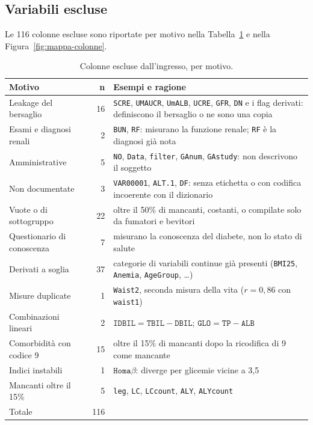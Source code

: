 \documentclass[a4paper, 12pt, oneside]{book}
\begin{document}
\subsection{Variabili escluse}

Le 116 colonne escluse sono riportate per motivo nella Tabella~\ref{tab:esclusioni} e nella Figura~\ref{fig:mappa-colonne}.

\begin{table}[H]
	\centering
	\small
	\caption{Colonne escluse dall'ingresso, per motivo.}
	\label{tab:esclusioni}
	\begin{tabularx}{\textwidth}{@{}>{\raggedright\arraybackslash}p{3.1cm} r >{\raggedright\arraybackslash}X@{}}
		\toprule
		Motivo & n & Esempi e ragione \\
		\midrule
		Leakage del bersaglio & 16 & \texttt{SCRE}, \texttt{UMAUCR}, \texttt{UmALB}, \texttt{UCRE}, \texttt{GFR}, \texttt{DN} e i flag derivati: definiscono il bersaglio o ne sono una copia \\
		Esami e diagnosi renali & 2 & \texttt{BUN}, \texttt{RF}: misurano la funzione renale; \texttt{RF} è la diagnosi già nota \\
		Amministrative & 5 & \texttt{NO}, \texttt{Data}, \texttt{filter}, \texttt{GAnum}, \texttt{GAstudy}: non descrivono il soggetto \\
		Non documentate & 3 & \texttt{VAR00001}, \texttt{ALT.1}, \texttt{DF}: senza etichetta o con codifica incoerente con il dizionario \\
		Vuote o di sottogruppo & 22 & oltre il 50\% di mancanti, costanti, o compilate solo da fumatori e bevitori \\
		Questionario di conoscenza & 7 & misurano la conoscenza del diabete, non lo stato di salute \\
		Derivati a soglia & 37 & categorie di variabili continue già presenti (\texttt{BMI25}, \texttt{Anemia}, \texttt{AgeGroup}, \dots) \\
		Misure duplicate & 1 & \texttt{Waist2}, seconda misura della vita ($r = 0{,}86$ con \texttt{waist1}) \\
		Combinazioni lineari & 2 & $\texttt{IDBIL} = \texttt{TBIL} - \texttt{DBIL}$; $\texttt{GLO} = \texttt{TP} - \texttt{ALB}$ \\
		Comorbidità con codice 9 & 15 & oltre il 15\% di mancanti dopo la ricodifica di 9 come mancante \\
		Indici instabili & 1 & $\texttt{Homa}\beta$: diverge per glicemie vicine a 3,5 \\
		Mancanti oltre il 15\% & 5 & \texttt{leg}, \texttt{LC}, \texttt{LCcount}, \texttt{ALY}, \texttt{ALYcount} \\
		\midrule
		Totale & 116 & \\
		\bottomrule
	\end{tabularx}
\end{table}
\end{document}

